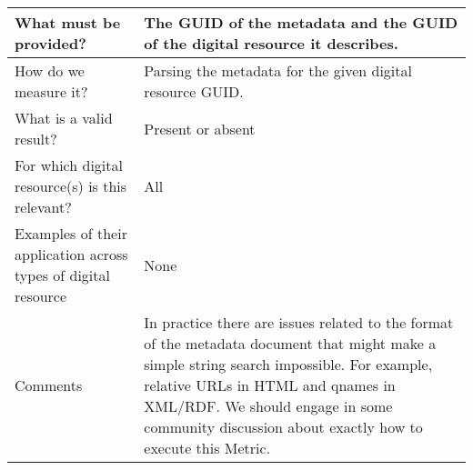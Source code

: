 \documentclass[english]{article}
\begin{document}
\begin{longtable}{|p{5cm}|p{9cm}|}
  
\\



\hline
What must be provided? &  


The GUID of the metadata and the GUID of the digital resource it describes.


 \\



\hline
How do we measure it? &  

Parsing the metadata for the given digital resource GUID.

\\



\hline
What is a valid result? &  


Present or absent


\\



\hline
For which digital resource(s) is this relevant? &  All\\



\hline
Examples of their application across types of digital resource &  

None


\\



\hline

Comments & 


In practice there are issues related to the format of the metadata document that might make a simple string search impossible.  For example, relative URLs in HTML and qnames in XML/RDF.  We should engage in some community discussion about exactly how to execute this Metric.

 \\ 
\hline

\end{longtable}
\end{document}
